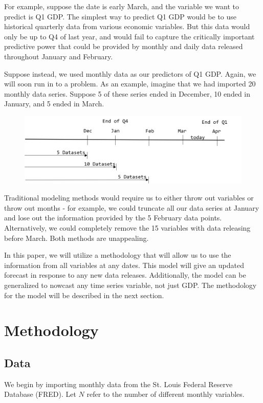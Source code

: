 \documentclass[11pt, letterpaper]{article}
\begin{document}
For example, suppose the date is early March, and the variable we want to predict is Q1 GDP. The simplest way to predict Q1 GDP would be to use historical quarterly data from various economic variables. But this data would only be up to Q4 of last year, and would fail to capture the critically important predictive power that could be provided by monthly and daily data released throughout January and February.

Suppose instead, we used monthly data as our predictors of Q1 GDP. Again, we will soon run in to a problem. As an example, imagine that we had imported 20 monthly data series. Suppose 5 of these series ended in December, 10 ended in January, and 5 ended in March. 

\begin{figure}[H]
\includegraphics[scale=.7]{nowcast-time-2}
\centering
\end{figure}

Traditional modeling methods would require us to either throw out variables or throw out months - for example, we could truncate all our data series at January and lose out the information provided by the 5 February data points. Alternatively, we could completely remove the 15 variables with data releasing before March. Both methods are unappealing.

In this paper, we will utilize a methodology that will allow us to use the information from all variables at any dates. This model will give an updated forecast in response to any new data releases. Additionally, the model can be generalized to nowcast any time series variable, not just GDP. The methodology for the model will be described in the next section.
\section{Methodology}

\subsection{Data}
We begin by importing monthly data from the St. Louis Federal Reserve Database (FRED). Let $N$ refer to the number of different monthly variables.
\end{document}
